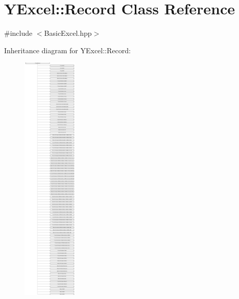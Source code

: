 \hypertarget{class_y_excel_1_1_record}{}\section{Y\+Excel\+:\+:Record Class Reference}
\label{class_y_excel_1_1_record}


{\ttfamily \#include $<$Basic\+Excel.\+hpp$>$}

Inheritance diagram for Y\+Excel\+:\+:Record\+:\begin{figure}[H]
\begin{center}
\leavevmode
\includegraphics[height=12.000000cm]{class_y_excel_1_1_record}
\end{center}
\end{figure}
